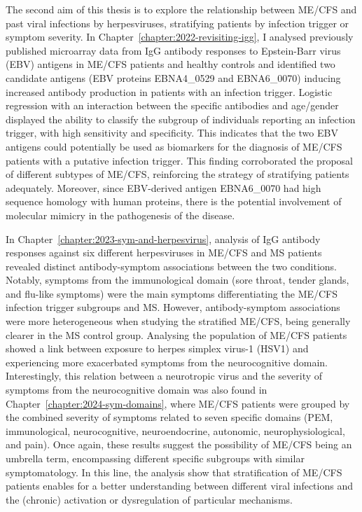 The second aim of this thesis is to explore the relationship between ME/CFS and past viral infections by herpesviruses, stratifying patients by infection trigger or symptom severity. In Chapter~\ref{chapter:2022-revisiting-igg}, I analysed previously published microarray data from IgG antibody responses to Epstein-Barr virus (EBV) antigens in ME/CFS patients and healthy controls and identified two candidate antigens (EBV proteins EBNA4\_0529 and EBNA6\_0070) inducing increased antibody production in patients with an infection trigger. Logistic regression with an interaction between the specific antibodies and age/gender displayed the ability to classify the subgroup of individuals reporting an infection trigger, with high sensitivity and specificity. This indicates that the two EBV antigens could potentially be used as biomarkers for the diagnosis of ME/CFS patients with a putative infection trigger. This finding corroborated the proposal of different subtypes of ME/CFS, reinforcing the strategy of stratifying patients adequately.
Moreover, since EBV-derived antigen EBNA6\_0070 had high sequence homology with human proteins, there is the potential involvement of molecular mimicry in the pathogenesis of the disease.

In Chapter~\ref{chapter:2023-sym-and-herpesvirus}, analysis of IgG antibody responses against six different herpesviruses in ME/CFS and MS patients revealed distinct antibody-symptom associations between the two conditions. Notably, symptoms from the immunological domain (sore throat, tender glands, and flu-like symptoms) were the main symptoms differentiating the ME/CFS infection trigger subgroups and MS. However, antibody-symptom associations were more heterogeneous when studying the stratified ME/CFS, being generally clearer in the MS control group. Analysing the population of ME/CFS patients showed a link between exposure to herpes simplex virus-1 (HSV1) and experiencing more exacerbated symptoms from the neurocognitive domain. Interestingly, this relation between a neurotropic virus and the severity of symptoms from the neurocognitive domain was also found in Chapter~\ref{chapter:2024-sym-domains}, where ME/CFS patients were grouped by the combined severity of symptoms related to seven specific domains (PEM, immunological, neurocognitive, neuroendocrine, autonomic, neurophysiological, and pain). Once again, these results suggest the possibility of ME/CFS being an umbrella term, encompassing different specific subgroups with similar symptomatology. In this line, the analysis show that stratification of ME/CFS patients enables for a better understanding between different viral infections and the (chronic) activation or dysregulation of particular mechanisms.

